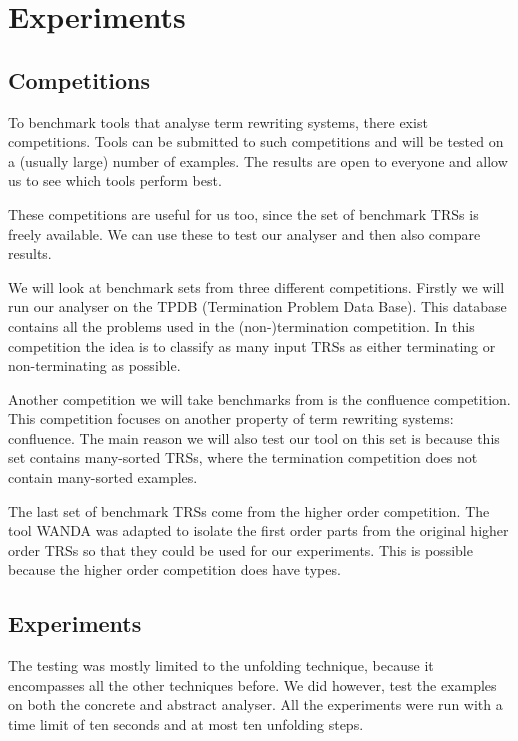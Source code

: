 \chapter{Experiments}\label{experiments}
\section{Competitions}
To benchmark tools that analyse term rewriting systems, there exist competitions. Tools can be submitted to such competitions and will be tested on a (usually large) number of examples. The results are open to everyone and allow us to see which tools perform best. 

These competitions are useful for us too, since the set of benchmark TRSs is freely available. We can use these to test our analyser and then also compare results. 

We will look at benchmark sets from three different competitions. Firstly we will run our analyser on the TPDB (Termination Problem Data Base)\cite{TermPortal}. This database contains all the problems used in the (non-)termination competition. In this competition the idea is to classify as many input TRSs as either terminating or non-terminating as possible. 

Another competition we will take benchmarks from is the confluence competition\cite{COPS}. This competition focuses on another property of term rewriting systems: confluence. The main reason we will also test our tool on this set is because this set contains many-sorted TRSs, where the termination competition does not contain many-sorted examples.

The last set of benchmark TRSs come from the higher order competition. The tool WANDA\cite{KOP:WANDASITE} was adapted to isolate the first order parts from the original higher order TRSs so that they could be used for our experiments. This is possible because the higher order competition does have types. 

\section{Experiments}
The testing was mostly limited to the unfolding technique, because it encompasses all the other techniques before. We did however, test the examples on both the concrete and abstract analyser. All the experiments were run with a time limit of ten seconds and at most ten unfolding steps. 

